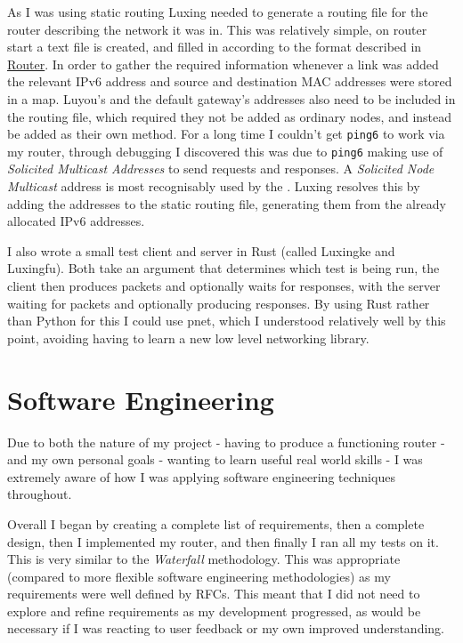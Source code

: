 \documentclass[12pt,a4paper,twoside,openright]{report}
\begin{document}
\bigskip

As I was using static routing Luxing needed to generate a routing file for the router describing the network it was in.  This was relatively simple, on router start a text file is created, and filled in according to the format described in \hyperref[sec::router]{Router}.  In order to gather the required information whenever a link was added the relevant IPv6 address and source and destination MAC addresses were stored in a map.  Luyou's and the default gateway's addresses also need to be included in the routing file, which required they not be added as ordinary nodes, and instead be added as their own method. For a long time I couldn't get \verb!ping6! to work via my router, through debugging I discovered this was due to \verb!ping6! making use of \textit{Solicited Multicast Addresses} to send requests and responses. A \textit{Solicited Node Multicast} address is most recognisably used by the \cite{Neighbour Discovery Protocol}\cite{ndp_rfc}. Luxing resolves this by adding the addresses to the static routing file, generating them from the already allocated IPv6 addresses.

\bigskip

I also wrote a small test client and server in Rust (called Luxingke and Luxingfu).  Both take an argument that determines which test is being run, the client then produces packets and optionally waits for responses, with the server waiting for packets and optionally producing responses.  By using Rust rather than Python for this I could use pnet, which I understood relatively well by this point, avoiding having to learn a new low level networking library.

\section{Software Engineering}
\label{sec::soft_eng}

Due to both the nature of my project - having to produce a functioning router - and my own personal goals - wanting to learn useful real world skills - I was extremely aware of how I was applying software engineering techniques throughout.

\bigskip

Overall I began by creating a complete list of requirements, then a complete design, then I implemented my router, and then finally I ran all my tests on it.  This is very similar to the \textit{Waterfall} methodology.  This was appropriate (compared to more flexible software engineering methodologies) as my requirements were well defined by RFCs. This meant that I did not need to explore and refine requirements as my development progressed, as would be necessary if I was reacting to user feedback or my own improved understanding.
\end{document}
